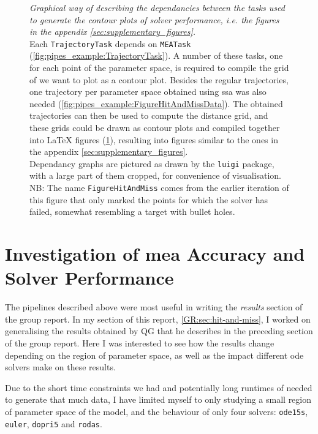 \begin{figure}
\begin{subfigure}[t]{\textwidth}
        \label{fig:pipes_example:FigureHitAndMissTex}
    \end{subfigure}
    \caption{\emph{Graphical way of describing the dependancies between the tasks used to generate the contour plots of solver performance, i.e. the figures in the appendix \autoref{sec:supplementary_figures}.}\\ 
    Each  \texttt{TrajectoryTask} depends on \texttt{MEATask} (\ref{fig:pipes_example:TrajectoryTask}).
    A number of these tasks, one for each point of the parameter space, is required to compile the grid of we want to plot as a contour plot.
    Besides the regular trajectories, one trajectory per parameter space obtained using \acrlong{ssa} was also needed (\ref{fig:pipes_example:FigureHitAndMissData}).
    The obtained trajectories can then be used to compute the distance grid, and these grids could be drawn as contour plots and compiled together into \LaTeX{} figures (\ref{fig:pipes_example:FigureHitAndMissTex}), resulting into figures similar to the ones in the appendix \autoref{sec:supplementary_figures}.\\
    Dependancy graphs are pictured as drawn by the {\tt luigi} package, with a large part of them cropped, for convenience of visualisation.\\
    NB: The name {\tt FigureHitAndMiss} comes from the earlier iteration of this figure that only marked the points for which the solver has failed, somewhat resembling a target with bullet holes.}
    \label{fig:pipes_example}
\end{figure}

\section{Investigation of \acrshort{mea} Accuracy and Solver Performance}

The pipelines described above were most useful in writing the \emph{results} section of the group report. In my section of this report, \autoref{GR:sec:hit-and-miss}, I worked on generalising the results obtained by QG that he describes in the preceding section of the group report. 
Here I was interested to see how the results change depending on the region of parameter space, as well as the impact different \gls{ode} solvers make on these results.

Due to the short time constraints we had and potentially long runtimes of needed to generate that much data, I have limited myself to only studying a small region of parameter space of the \pft{} model, and the behaviour of only four solvers: \texttt{ode15s}, \texttt{euler}, \texttt{dopri5} and \texttt{rodas}.

